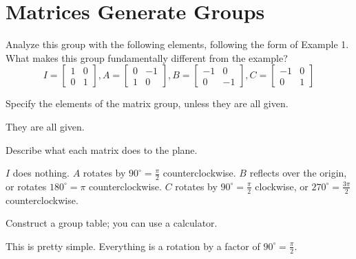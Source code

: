\documentclass[../key.tex]{subfiles}
\begin{document}
\section{Matrices Generate Groups}

\begin{outer_problem}[start=1]
\item Analyze this group with the following elements, following the form of Example 1. What makes this group fundamentally different from the example?
$$I=\left[\begin{array}{cc} 1 & 0 \\ 0 & 1 \end{array}\right], A=\left[\begin{array}{cc} 0 & -1 \\ 1 & 0 \end{array}\right], B=\left[\begin{array}{cc} -1 & 0 \\ 0 & -1 \end{array}\right], C=\left[\begin{array}{cc} -1 & 0 \\ 0 & 1 \end{array}\right]$$
\end{outer_problem}

\begin{iinner_problem}[start=1]
\item Specify the elements of the matrix group, unless they are all given.
\end{iinner_problem}

They are all given.

\begin{iinner_problem}
\item Describe what each matrix does to the plane.
\end{iinner_problem}

$I$ does nothing. $A$ rotates by $90^\circ=\frac{\pi}{2}$ counterclockwise. $B$ reflects over the origin, or rotates $180^\circ=\pi$ counterclockwise. $C$ rotates by $90^\circ=\frac{\pi}{2}$ clockwise, or $270^\circ=\frac{3\pi}{2}$ counterclockwise.

\begin{iinner_problem}
\item Construct a group table; you can use a calculator.
\end{iinner_problem}

This is pretty simple. Everything is a rotation by a factor of $90^\circ=\frac{\pi}{2}$.
\end{document}
